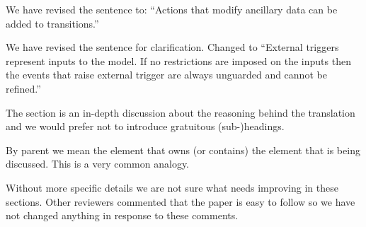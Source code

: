 \documentclass{response}
\begin{document}
\begin{response}
  We have revised the sentence to: ``Actions that modify ancillary data can be added to transitions.''
\end{response}

\begin{comment}{Reviewer \#3}
* Line -4: I don't understand: "Note that external triggers are always unguarded ...".
\end{comment}

\begin{response}
  We have revised the sentence for clarification. Changed to ``External triggers represent inputs to the model. If no restrictions are imposed on the inputs then the events that raise external trigger are always unguarded and cannot be refined.''
\end{response}

\begin{comment}{Reviewer \#3}
  Page 8:

* The next couple of pages is a lot of English without some structure to hang it up on.
\end{comment}

\begin{response}
  The section is an in-depth discussion about the reasoning behind the translation and we would prefer not to introduce gratuitous (sub-)headings.
\end{response}

\begin{comment}{Reviewer \#3}
  Page 9:

* The three bullets (refinement, invariant, guard): there is mention of the parent state. Not sure I understand.
\end{comment}

\begin{response}
	By parent we mean the element that owns (or contains) the element that is being discussed. This is a very common analogy.
\end{response}

\begin{comment}{Reviewer \#3}
  Page 10:

* In general, the explanation of the example could be improved a lot.

  Page 12:

* I had a hard time reading this.
\end{comment}

\begin{response}
  Without more specific details we are not sure what needs improving in these sections. Other reviewers commented that  the paper is easy to follow so we have not changed anything in response to these comments.
\end{response}
\end{document}
